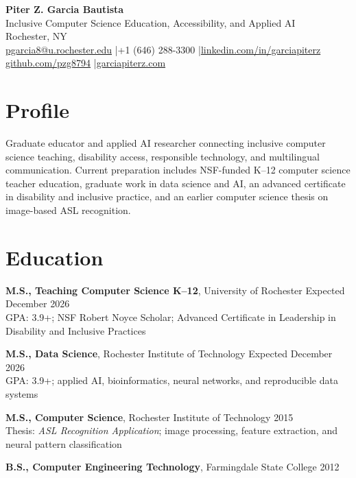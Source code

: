 \documentclass[10pt,letterpaper]{article}
\begin{document}
\fontsize{9}{10.4}\selectfont

\begin{center}
  {\Large\bfseries Piter Z. Garcia Bautista}\\[1pt]
  {\large Inclusive Computer Science Education, Accessibility, and Applied AI}\\[2pt]
  Rochester, NY\\
  \href{mailto:pgarcia8@u.rochester.edu}{pgarcia8@u.rochester.edu}
  \enspace|\enspace +1 (646) 288-3300
  \enspace|\enspace \href{https://linkedin.com/in/garciapiterz}{linkedin.com/in/garciapiterz}\\
  \href{https://github.com/pzg8794}{github.com/pzg8794}
  \enspace|\enspace \href{https://garciapiterz.com}{garciapiterz.com}
\end{center}

\section*{Profile}
Graduate educator and applied AI researcher connecting inclusive computer
science teaching, disability access, responsible technology, and multilingual
communication. Current preparation includes NSF-funded K--12 computer science
teacher education, graduate work in data science and AI, an advanced
certificate in disability and inclusive practice, and an earlier computer
science thesis on image-based ASL recognition.

\section*{Education}
\textbf{M.S., Teaching Computer Science K--12}, University of Rochester
\hfill Expected December 2026\\
GPA: 3.9+; NSF Robert Noyce Scholar; Advanced Certificate in Leadership in
Disability and Inclusive Practices

\textbf{M.S., Data Science}, Rochester Institute of Technology
\hfill Expected December 2026\\
GPA: 3.9+; applied AI, bioinformatics, neural networks, and reproducible data systems

\textbf{M.S., Computer Science}, Rochester Institute of Technology
\hfill 2015\\
Thesis: \textit{ASL Recognition Application}; image processing, feature
extraction, and neural pattern classification

\textbf{B.S., Computer Engineering Technology}, Farmingdale State College
\hfill 2012
\end{document}

